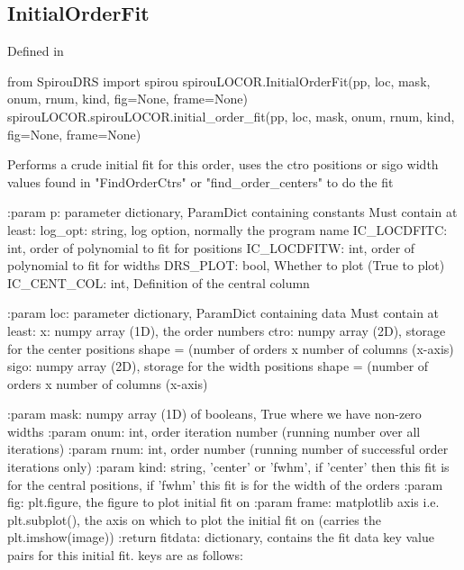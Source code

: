 \begin{minipage}{\textwidth}
\subsection{InitialOrderFit}

Defined in \spirouLOCOR{}

\begin{pythonbox}
from SpirouDRS import spirou
spirouLOCOR.InitialOrderFit(pp, loc, mask, onum, rnum, kind, fig=None, frame=None)
spirouLOCOR.spirouLOCOR.initial_order_fit(pp, loc, mask, onum, rnum, kind, fig=None, frame=None)
\end{pythonbox}

\begin{pythondocstring}
Performs a crude initial fit for this order, uses the ctro positions or sigo 
width values found in "FindOrderCtrs" or "find_order_centers" to do the fit

:param p: parameter dictionary, ParamDict containing constants
    Must contain at least:
            log_opt: string, log option, normally the program name
            IC_LOCDFITC: int, order of polynomial to fit for positions
            IC_LOCDFITW: int, order of polynomial to fit for widths
            DRS_PLOT: bool, Whether to plot (True to plot)
            IC_CENT_COL: int, Definition of the central column

:param loc: parameter dictionary, ParamDict containing data
        Must contain at least:
            x: numpy array (1D), the order numbers
            ctro: numpy array (2D), storage for the center positions
                  shape = (number of orders x number of columns (x-axis)
            sigo: numpy array (2D), storage for the width positions
                  shape = (number of orders x number of columns (x-axis)

:param mask: numpy array (1D) of booleans, True where we have non-zero
             widths
:param onum: int, order iteration number (running number over all
             iterations)
:param rnum: int, order number (running number of successful order
             iterations only)
:param kind: string, 'center' or 'fwhm', if 'center' then this fit is for
             the central positions, if 'fwhm' this fit is for the width of
             the orders
:param fig: plt.figure, the figure to plot initial fit on
:param frame: matplotlib axis i.e. plt.subplot(), the axis on which to plot
              the initial fit on (carries the plt.imshow(image))
:return fitdata: dictionary, contains the fit data key value pairs for this
                 initial fit. keys are as follows:


\end{pythondocstring}
\end{minipage}
